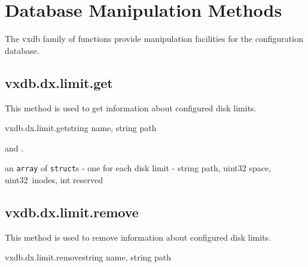\chapter{Database Manipulation Methods}

The vxdb family of functions provide manipulation facilities for the
configuration database.


\section{vxdb.dx.limit.get}

This method is used to get information about configured disk limits.

\begin{rpcsynopsis}{vxdb.dx.limit.get}{string name, string path}
\end{rpcsynopsis}

\begin{rpcaccess}
 and \rpcownerchecks.
\end{rpcaccess}

\begin{rpcreturncomplex}{an \texttt{array} of \texttt{struct}s - one for each
	disk limit - }{string path, uint32 space, uint32~inodes, int reserved}
\end{rpcreturncomplex}

\rpcnoerrors


\section{vxdb.dx.limit.remove}

This method is used to remove information about configured disk limits.

\begin{rpcsynopsis}{vxdb.dx.limit.remove}{string name, string path}
\end{rpcsynopsis}

